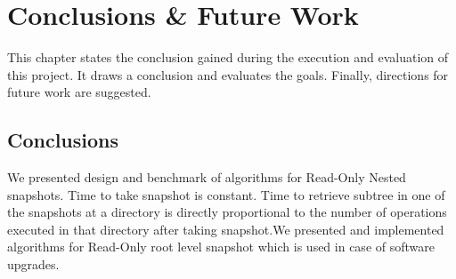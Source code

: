 
%
%
%


\chapter{Conclusions \& Future Work}
\label{ch:conclusion}
This chapter states the conclusion gained during the execution and evaluation of
this project. It draws a conclusion and evaluates the goals. Finally, directions for
future work are suggested.

\section{Conclusions}
We presented design and benchmark of algorithms for Read-Only Nested snapshots. Time to take snapshot is constant. Time to retrieve subtree in one of the snapshots at a directory is directly proportional to the number of operations executed in that directory after taking snapshot.We presented and implemented algorithms for Read-Only root level snapshot which is used in case of software upgrades.
